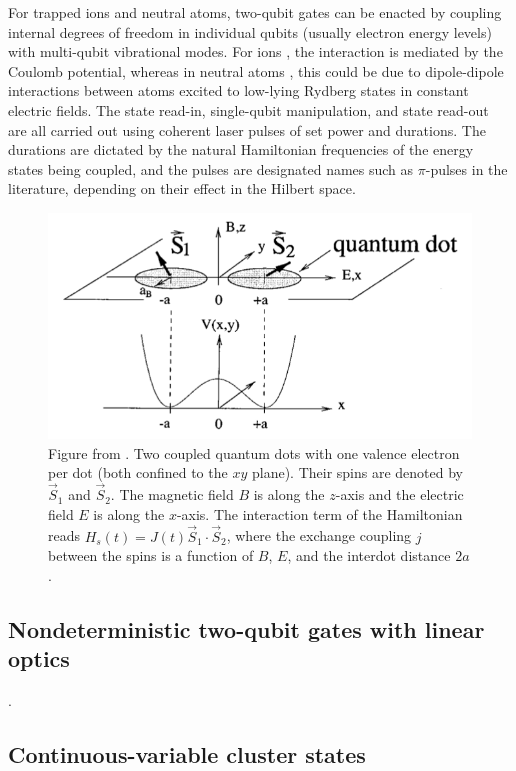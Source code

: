 \documentclass[twocolumn]{Styles/IEEEtran11}
\begin{document}
For trapped ions and neutral atoms, two-qubit gates can be enacted by coupling internal degrees of freedom in individual qubits (usually electron energy levels) with multi-qubit vibrational modes. For ions \cite{zoller1995}, the interaction is mediated by the Coulomb potential, whereas in neutral atoms \cite{lukin2000}, this could be due to dipole-dipole interactions between atoms excited to low-lying Rydberg states in constant electric fields. The state read-in, single-qubit manipulation, and state read-out are all carried out using coherent laser pulses of set power and durations. The durations are dictated by the natural Hamiltonian frequencies of the energy states being coupled, and the pulses are designated names such as $\pi$-pulses in the literature, depending on their effect in the Hilbert space.

\begin{figure}[hbt]
  \centering
  \includegraphics[width=\linewidth]{Images/qdot.png}
  \caption{Figure from \protect\cite{divincenzo1999}. Two coupled quantum dots with one valence electron per dot (both confined to the $xy$ plane). Their spins are denoted by $\vec{S}_1$ and $\vec{S}_2$. The magnetic field $B$ is along the $z$-axis and the electric field $E$ is along the $x$-axis. The interaction term of the Hamiltonian reads $H_s(t) = J(t)\vec{S}_1\cdot\vec{S}_2$, where the exchange coupling $j$ between the spins is a function of $B$, $E$, and the interdot distance $2a$.}
  \label{qdotfig}
\end{figure}

\subsection{Nondeterministic two-qubit gates with linear optics}

\cite{klm2000}.

\subsection{Continuous-variable cluster states}
\end{document}
